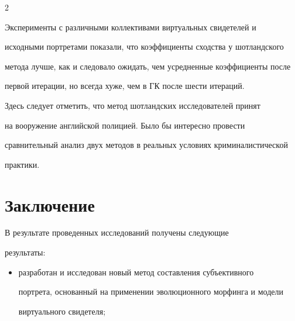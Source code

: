 \begin{multicols}{2}
{





}


     


     Эксперименты с различными коллективами виртуальных свидетелей и 


исходными портретами показали, что коэффициенты сходства у шотландского 


метода лучше, как и следовало ожидать, чем усредненные коэффициенты после 


первой итерации, но всегда хуже, чем в ГК после шести итераций. 


     


     Здесь следует отметить, что метод шотландских исследователей принят 


на вооружение английской полицией. Было бы интересно провести 


сравнительный анализ двух методов в реальных условиях криминалистической 


практики.


     


\section{Заключение}


     


     В результате проведенных исследований получены следующие 


результаты:


     \begin{itemize}


\item разработан и исследован новый метод со\-став\-ле\-ния субъективного 


портрета, основанный на применении эволюционного морфинга и модели 


виртуального свидетеля;\end{itemize}










\end{multicols}





